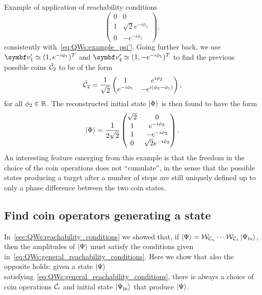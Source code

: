\begin{examplebox}[label=ex:QWs:conditions_few_steps]{Example of application of reachability conditions}
\begin{equation}
\begin{pmatrix}
            0 & 0 \\
            1 & \sqrt2 e^{-i\phi_1} \\
            0 & -e^{-i\phi_1}
        \end{pmatrix},
    \end{equation}
    consistently with~\cref{eq:QWs:example_psi'}.
    Going further back, we use $\bs v_1'\simeq(1,e^{-i\phi_1})^T$ and $\bs v_4'\simeq(1,-e^{-i\phi_1})^T$ to find the previous possible coins $\tilde{{\mathcal{C}}}_2$ to be of the form
    \begin{equation}
        \tilde{{\mathcal{C}}}_2 = \frac{1}{\sqrt2} \begin{pmatrix}
            1 & e^{i\phi_2} \\
            e^{-i\phi_1} & -e^{i(\phi_2-\phi_1)}
        \end{pmatrix},
    \end{equation}
    for all $\phi_2\in{\mathbb{R}}$. The reconstructed initial state $\ket\Phi$ is then found to have the form
    \begin{equation}
        \ket\Phi = \frac{1}{2\sqrt2}
        \begin{pmatrix}
            \sqrt2 & 0 \\
            1 & e^{-i\phi_2} \\
            1 & -e^{-i\phi_2} \\
            0 & \sqrt2 e^{-i\phi_2}
        \end{pmatrix}.
    \end{equation}
    An interesting feature emerging from this example is that the freedom in the choice of the coin operations does not ``cumulate'', in the sense that the possible states producing a target after a number of steps are still uniquely defined up to only a phase difference between the two coin states.
\end{examplebox}

\subsection{Find coin operators generating a state}
\label{sec:QWs:coin_operators_generating_state}

In~\cref{sec:QWs:reachability_conditions} we showed that, if $\ket\Psi={\mathcal{W}}_{{\mathcal{C}}_n}\cdots{\mathcal{W}}_{{\mathcal{C}}_1}\ket{\Psi_{\operatorname{in}}}$, then the amplitudes of $\ket\Psi$ must satisfy the conditions given in~\cref{eq:QWs:general_reachability_conditions}.
Here we show that also the opposite holds: given a state $\ket\Psi$ satisfying~\cref{eq:QWs:general_reachability_conditions}, there is always a choice of coin operations ${\mathcal{C}}_i$ and initial state $\ket{\Psi_{\operatorname{in}}}$ that produce $\ket\Psi$.

